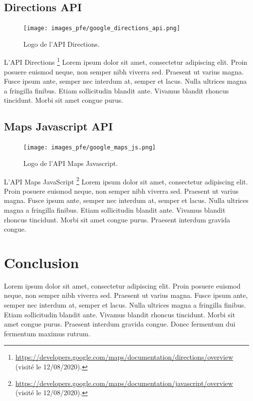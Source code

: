 \vspace{1cm}

\subsection*{Directions API}
\begin{figure}
  \centering
  \texttt{[image: images\_pfe/google\_directions\_api.png]}
  \caption{Logo de l'API Directions.}
\end{figure}
\FloatBarrier
L'API Directions \footnote{\url{https://developers.google.com/maps/documentation/directions/overview} (visité le 12/08/2020).} Lorem ipsum dolor sit amet, consectetur adipiscing elit. Proin posuere euismod neque, non semper nibh viverra sed. Praesent ut varius magna. Fusce ipsum ante, semper nec interdum at, semper et lacus. Nulla ultrices magna a fringilla finibus. Etiam sollicitudin blandit ante. Vivamus blandit rhoncus tincidunt. Morbi sit amet congue purus.

\vspace{1cm}

\subsection*{Maps Javascript API}
\begin{figure}
  \centering
  \texttt{[image: images\_pfe/google\_maps\_js.png]}
  \caption{Logo de l'API Maps Javascript.}
\end{figure}
\FloatBarrier
L'API Maps JavaScript \footnote{\url{https://developers.google.com/maps/documentation/javascript/overview} (visité le 12/08/2020).} Lorem ipsum dolor sit amet, consectetur adipiscing elit. Proin posuere euismod neque, non semper nibh viverra sed. Praesent ut varius magna. Fusce ipsum ante, semper nec interdum at, semper et lacus. Nulla ultrices magna a fringilla finibus. Etiam sollicitudin blandit ante. Vivamus blandit rhoncus tincidunt. Morbi sit amet congue purus. Praesent interdum gravida congue.

\vspace{1cm}

\section{Conclusion}
Lorem ipsum dolor sit amet, consectetur adipiscing elit. Proin posuere euismod neque, non semper nibh viverra sed. Praesent ut varius magna. Fusce ipsum ante, semper nec interdum at, semper et lacus. Nulla ultrices magna a fringilla finibus. Etiam sollicitudin blandit ante. Vivamus blandit rhoncus tincidunt. Morbi sit amet congue purus. Praesent interdum gravida congue. Donec fermentum dui fermentum maximus rutrum.

